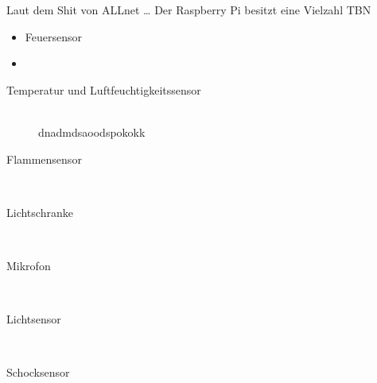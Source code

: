 
Laut dem Shit von ALLnet \cite{111861pd90} \ldots
Der Raspberry Pi besitzt eine Vielzahl  TBN
\begin{itemize}
\item Feuersensor
\item
\end{itemize}

\begin{description}
\item[Temperatur und Luftfeuchtigkeitssensor] \hfill \\
	dnadmdsaoodspokokk
\item[Flammensensor]\hfill \\
\item[Lichtschranke]\hfill \\
\item[Mikrofon]\hfill \\
\item[Lichtsensor]\hfill \\
\item[Schocksensor]\hfill \\
\end{description}